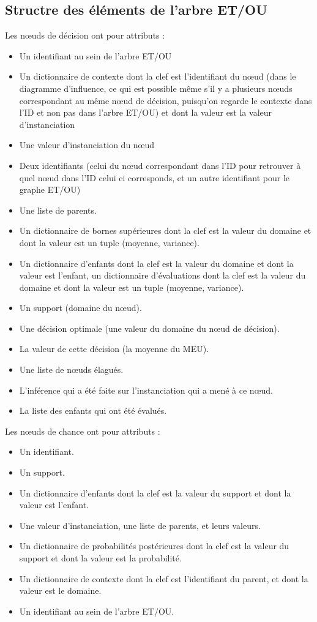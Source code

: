 \documentclass[12pt]{article}
\begin{document}
\subsection{Structre des éléments de l'arbre ET/OU}
Les nœuds de décision ont pour attributs :
\begin{itemize}
\item Un identifiant au sein de l'arbre ET/OU
\item Un dictionnaire de contexte dont la clef est l'identifiant du nœud (dans le diagramme d'influence, ce qui est possible même s'il y a plusieurs nœuds correspondant au même nœud de décision, puisqu'on regarde le contexte dans l'ID et non pas dans l'arbre ET/OU) et dont la valeur est la valeur d'instanciation
\item Une valeur d'instanciation du nœud
\item Deux identifiants (celui du nœud correspondant dans l'ID pour retrouver à quel nœud dans l'ID celui ci corresponds, et un autre identifiant pour le graphe ET/OU)
\item Une liste de parents.
\item Un dictionnaire de bornes supérieures dont la clef est la valeur du domaine et dont la valeur est un tuple (moyenne, variance).
\item Un dictionnaire d'enfants dont la clef est la valeur du domaine et dont la valeur est l'enfant, un dictionnaire d'évaluations dont la clef est la valeur du domaine et dont la valeur est un tuple (moyenne, variance).
\item Un support (domaine du nœud).
\item Une décision optimale (une valeur du domaine du nœud de décision).
\item La valeur de cette décision (la moyenne du MEU).
\item Une liste de nœuds élagués.
\item L'inférence qui a été faite sur l'instanciation qui a mené à ce nœud.
\item La liste des enfants qui ont été évalués.
\end{itemize}
Les nœuds de chance ont pour attributs :
\begin{itemize}
\item Un identifiant.
\item Un support.
\item Un dictionnaire d'enfants dont la clef est la valeur du support et dont la valeur est l'enfant.
\item Une valeur d'instanciation, une liste de parents, et leurs valeurs.
\item Un dictionnaire de probabilités postérieures dont la clef est la valeur du support et dont la valeur est la probabilité.
\item Un dictionnaire de contexte dont la clef est l'identifiant du parent, et dont la valeur est le domaine.
\item Un identifiant au sein de l'arbre ET/OU.
\end{itemize}
\end{document}
